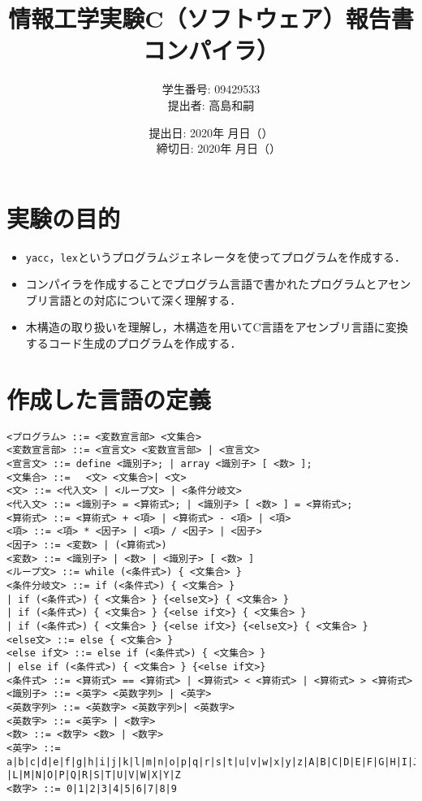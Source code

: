 \documentclass{jarticle}[11pt]
\title{{\normalsize 情報工学実験C（ソフトウェア）報告書}\\
    コンパイラ）\\
    }
\author{ 
      学生番号: 09429533 \\
      提出者: 高島和嗣
    }
\date{
      提出日: 2020年 月日（） \\　%
      締切日: 2020年 月日（）
    }
\begin{document}
    \maketitle
\section{実験の目的}
\begin{itemize}
\item \verb|yacc|，\verb|lex|というプログラムジェネレータを使ってプログラムを作成する．
\item コンパイラを作成することでプログラム言語で書かれたプログラムとアセンブリ言語との対応について深く理解する．
\item 木構造の取り扱いを理解し，木構造を用いてC言語をアセンブリ言語に変換するコード生成のプログラムを作成する．
\end{itemize}

\section{作成した言語の定義}
\begin{verbatim}
<プログラム> ::= <変数宣言部> <文集合>
<変数宣言部> ::= <宣言文> <変数宣言部> | <宣言文>
<宣言文> ::= define <識別子>; | array <識別子> [ <数> ];
<文集合> ::= 　<文> <文集合>| <文>
<文> ::= <代入文> | <ループ文> | <条件分岐文>
<代入文> ::= <識別子> = <算術式>; | <識別子> [ <数> ] = <算術式>;
<算術式> ::= <算術式> + <項> | <算術式> - <項> | <項>
<項> ::= <項> * <因子> | <項> / <因子> | <因子>
<因子> ::= <変数> | (<算術式>)
<変数> ::= <識別子> | <数> | <識別子> [ <数> ]
<ループ文> ::= while (<条件式>) { <文集合> }
<条件分岐文> ::= if (<条件式>) { <文集合> } 
| if (<条件式>) { <文集合> } {<else文>} { <文集合> } 
| if (<条件式>) { <文集合> } {<else if文>} { <文集合> } 
| if (<条件式>) { <文集合> } {<else if文>} {<else文>} { <文集合> } 
<else文> ::= else { <文集合> }
<else if文> ::= else if (<条件式>) { <文集合> } 
| else if (<条件式>) { <文集合> } {<else if文>}
<条件式> ::= <算術式> == <算術式> | <算術式> < <算術式> | <算術式> > <算術式> 
<識別子> ::= <英字> <英数字列> | <英字>
<英数字列> ::= <英数字> <英数字列>| <英数字>
<英数字> ::= <英字> | <数字>
<数> ::= <数字> <数> | <数字>
<英字> ::= a|b|c|d|e|f|g|h|i|j|k|l|m|n|o|p|q|r|s|t|u|v|w|x|y|z|A|B|C|D|E|F|G|H|I|J|K
|L|M|N|O|P|Q|R|S|T|U|V|W|X|Y|Z
<数字> ::= 0|1|2|3|4|5|6|7|8|9
\end{verbatim}

\end{document}
